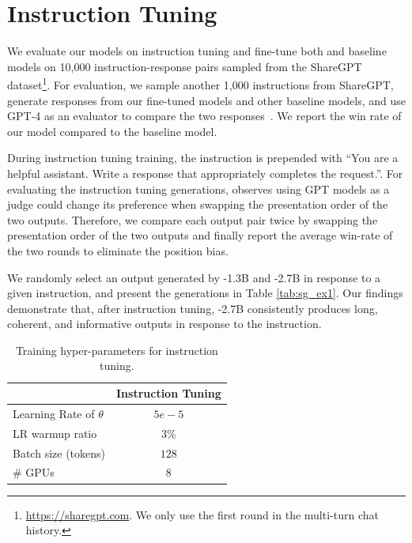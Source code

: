 \section{Instruction Tuning}
\label{app:instruction}

We evaluate our models on instruction tuning and fine-tune both \ours{}
and baseline models on  
10,000 instruction-response pairs sampled from the ShareGPT dataset\footnote{\url{https://sharegpt.com}. We only use the first round in the multi-turn chat history.}. 
For evaluation, we sample another 1,000 instructions from ShareGPT, generate responses from our fine-tuned models and other baseline models, and use 
GPT-4 
as an evaluator to compare the two responses~\citep{dubois2023alpacafarm}. 
We report the win rate of our model compared to the baseline model.

During instruction tuning training, the instruction is prepended with ``You are a helpful assistant. Write a response that appropriately completes the request.''. For evaluating the instruction tuning generations, \cite{wang2023faireval} observes using GPT models as a judge could change its preference when swapping the presentation order of the two outputs. Therefore, we compare each output pair twice by swapping the presentation order of the two outputs and finally report the average win-rate of the two rounds to eliminate the position bias. 

We randomly select an output generated by \ours{}-1.3B and \ours{}-2.7B in response to a given instruction, and present the generations in Table \ref{tab:sg_ex1}. Our findings demonstrate that, after instruction tuning, \ours{}-2.7B consistently produces long, coherent, and informative outputs in response to the instruction.  

\begin{table}[h]
    \label{tab:instruction_tuning_hp}
    \centering
    \caption{Training hyper-parameters for instruction tuning.}
    \begin{tabular}{lc} \toprule
                                                                    & Instruction Tuning  \\ \midrule
    Learning Rate of $\theta$                          & $5e-5$ \\
    LR warmup ratio                                                 & $3\%$     \\
    Batch size        (tokens)                                              & $128$    \\
    \# GPUs & $8$ \\
    \bottomrule 
    \end{tabular}
\end{table}



